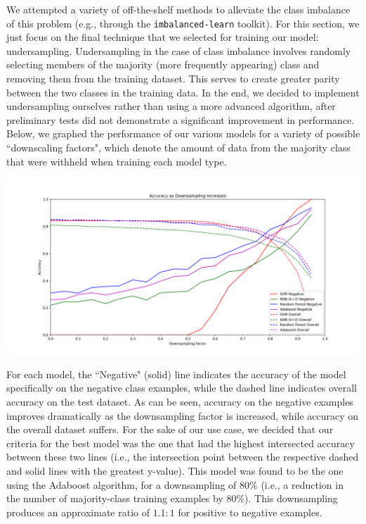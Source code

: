 \documentclass[conference]{IEEEtran}
\begin{document}
We attempted a variety of off-the-shelf methods to alleviate the class imbalance of this problem (e.g., through the \texttt{imbalanced-learn} toolkit). For this section, we just focus on the final technique that we selected for training our model: undersampling. Undersampling in the case of class imbalance involves randomly selecting members of the majority (more frequently appearing) class and removing them from the training dataset. This serves to create greater parity between the two classes in the training data. In the end, we decided to implement undersampling ourselves rather than using a more advanced algorithm, after preliminary tests did not demonstrate a significant improvement in performance. Below, we graphed the performance of our various models for a variety of possible ``downscaling factors", which denote the amount of data from the majority class that were withheld when training each model type. \\

\begin{center}
\includegraphics[scale=0.25]{Accuracy_as_Downsampling_Increases.png}
\end{center}

For each model, the ``Negative" (solid) line indicates the accuracy of the model specifically on the negative class examples, while the dashed line indicates overall accuracy on the test dataset. As can be seen, accuracy on the negative examples improves dramatically as the downsampling factor is increased, while accuracy on the overall dataset suffers. For the sake of our use case, we decided that our criteria for the best model was the one that had the highest intersected accuracy between these two lines (i.e., the intersection point between the respective dashed and solid lines with the greatest y-value). This model was found to be the one using the Adaboost algorithm, for a downsampling of $80\%$ (i.e., a reduction in the number of majority-class training examples by $80\%$). This downsampling produces an approximate ratio of $1.1:1$ for positive to negative examples. \\
\end{document}
